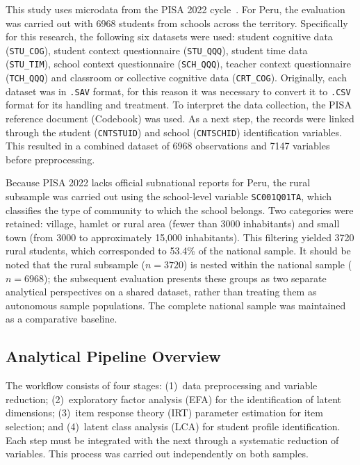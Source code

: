 \documentclass[runningheads]{llncs}
\begin{document}
This study uses microdata from the PISA 2022
cycle~\cite{oecd2024technical}. For Peru, the evaluation was
carried out with 6968 students from schools across the
territory. Specifically for this research, the following six
datasets were used: student cognitive data
(\texttt{STU\_COG}), student context questionnaire
(\texttt{STU\_QQQ}), student time data (\texttt{STU\_TIM}),
school context questionnaire (\texttt{SCH\_QQQ}), teacher
context questionnaire (\texttt{TCH\_QQQ}) and classroom or
collective cognitive data (\texttt{CRT\_COG}). Originally, each
dataset was in \texttt{.SAV} format, for this reason it was
necessary to convert it to \texttt{.CSV} format for its handling
and treatment. To interpret the data collection, the PISA
reference document (Codebook) was used. As a next step, the
records were linked through the student (\texttt{CNTSTUID}) and
school (\texttt{CNTSCHID}) identification variables. This
resulted in a combined dataset of 6968 observations and 7147
variables before preprocessing.

Because PISA 2022 lacks official subnational reports for Peru,
the rural subsample was carried out using the school-level
variable \texttt{SC001Q01TA}, which classifies the type of
community to which the school belongs. Two categories were
retained: village, hamlet or rural area (fewer than 3000
inhabitants) and small town (from 3000 to approximately 15,000
inhabitants). This filtering yielded 3720 rural students, which
corresponded to 53.4\% of the national sample. It should be
noted that the rural subsample (\(n = 3720\)) is nested within
the national sample (\(n = 6968\)); the subsequent evaluation
presents these groups as two separate analytical perspectives on
a shared dataset, rather than treating them as autonomous sample
populations. The complete national sample was maintained as a
comparative baseline.

\subsection{Analytical Pipeline Overview}

The workflow consists of four stages: (1)~data preprocessing and
variable reduction; (2)~exploratory factor analysis (EFA) for
the identification of latent dimensions; (3)~item response
theory (IRT) parameter estimation for item selection; and
(4)~latent class analysis (LCA) for student profile
identification. Each step must be integrated with the next
through a systematic reduction of variables. This process was
carried out independently on both samples.
\end{document}
